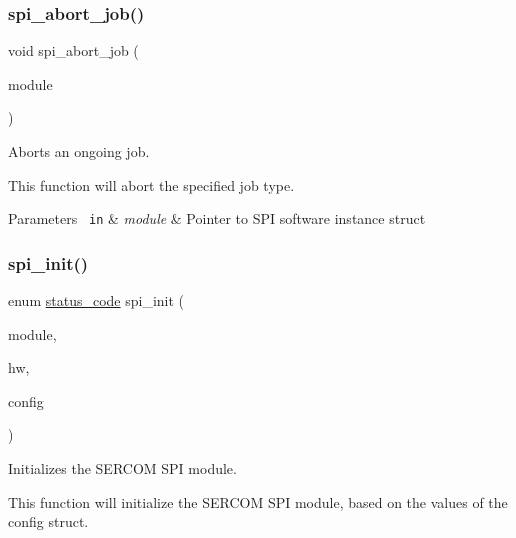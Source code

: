 \subsubsection{\texorpdfstring{spi\_abort\_job()}{spi\_abort\_job()}}
{\footnotesize\ttfamily void spi\+\_\+abort\+\_\+job (\begin{DoxyParamCaption}\item[{struct \mbox{\hyperlink{structspi__module}{spi\+\_\+module}} $\ast$const}]{module }\end{DoxyParamCaption})}



Aborts an ongoing job. 

This function will abort the specified job type.


\begin{DoxyParams}[1]{Parameters}
\mbox{\texttt{ in}}  & {\em module} & Pointer to S\+PI software instance struct \\
\hline
\end{DoxyParams}
\mbox{\label{group__asfdoc__sam0__sercom__spi__group_ga83b840fe8c91173bfe54a13787c262e6}} 
\subsubsection{\texorpdfstring{spi\_init()}{spi\_init()}}
{\footnotesize\ttfamily enum \mbox{\hyperlink{group__group__sam0__utils__status__codes_ga751c892e5a46b8e7d282085a5a5bf151}{status\+\_\+code}} spi\+\_\+init (\begin{DoxyParamCaption}\item[{struct \mbox{\hyperlink{structspi__module}{spi\+\_\+module}} $\ast$const}]{module,  }\item[{\mbox{\hyperlink{union_sercom}{Sercom}} $\ast$const}]{hw,  }\item[{const struct \mbox{\hyperlink{structspi__config}{spi\+\_\+config}} $\ast$const}]{config }\end{DoxyParamCaption})}



Initializes the S\+E\+R\+C\+OM S\+PI module. 

This function will initialize the S\+E\+R\+C\+OM S\+PI module, based on the values of the config struct.


